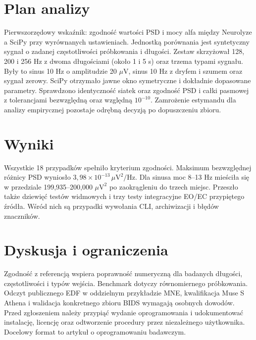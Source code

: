 \documentclass[11pt,a4paper]{article}
\begin{document}
\section{Plan analizy}
Pierwszorzędowy wskaźnik: zgodność wartości PSD i mocy alfa między Neurolyze a SciPy przy wyrównanych ustawieniach. Jednostką porównania jest syntetyczny sygnał o zadanej częstotliwości próbkowania i długości. Zestaw skrzyżował 128, 200 i 256 Hz z dwoma długościami (około 1 i 5 s) oraz trzema typami sygnału. Były to sinus 10 Hz o amplitudzie 20 $\mu$V, sinus 10 Hz z dryfem i szumem oraz sygnał zerowy. SciPy otrzymało jawne okno symetryczne i dokładnie dopasowane parametry. Sprawdzono identyczność siatek oraz zgodność PSD i całki pasmowej z tolerancjami bezwzględną oraz względną $10^{-10}$. Zamrożenie estymandu dla analizy empirycznej pozostaje odrębną decyzją po dopuszczeniu zbioru.

\section{Wyniki}
Wszystkie 18 przypadków spełniło kryterium zgodności. Maksimum bezwzględnej różnicy PSD wyniosło $3{,}98\times10^{-13}\,\mu\mathrm{V}^2/\mathrm{Hz}$. Dla sinusa moc 8--13 Hz mieściła się w przedziale 199,935--200,000 $\mu\mathrm{V}^2$ po zaokrągleniu do trzech miejsc. Przeszło także dziewięć testów widmowych i trzy testy integracyjne EO/EC przypiętego źródła. Wśród nich są przypadki wywołania CLI, archiwizacji i błędów znaczników.

\section{Dyskusja i ograniczenia}
Zgodność z referencją wspiera poprawność numeryczną dla badanych długości, częstotliwości i typów wejścia. Benchmark dotyczy równomiernego próbkowania. Odczyt publicznego EDF w oddzielnym przykładzie MNE, kwalifikacja Muse S Athena i walidacja konkretnego zbioru BIDS wymagają osobnych dowodów. Przed zgłoszeniem należy przypiąć wydanie oprogramowania i udokumentować instalację, licencję oraz odtworzenie procedury przez niezależnego użytkownika. Docelowy format to artykuł o oprogramowaniu badawczym.


\end{document}
